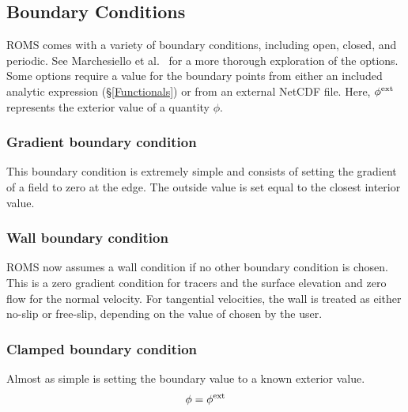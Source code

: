 


\subsection{Boundary Conditions}
ROMS comes with a variety of boundary conditions, including open,
closed, and periodic. See Marchesiello et al.\
\cite{Marchesiello2001} for a more thorough exploration of the
options. Some options require a value for the boundary points
from either an included analytic expression (\S\ref{Functionals})
or from an external NetCDF file. Here, $\phi^{\rm ext}$ represents
the exterior value of a quantity $\phi$.

\subsubsection{Gradient boundary condition}
This boundary condition is extremely simple and consists of setting the
gradient of a field to zero at the edge. The outside value is set equal
to the closest interior value.

\subsubsection{Wall boundary condition}
ROMS now assumes a wall condition if no other boundary condition is
chosen. This is a zero gradient condition for tracers and the
surface elevation and zero flow for the normal velocity. For
tangential velocities, the wall is treated as either no-slip or
free-slip, depending on the value of  chosen by the
user.

\subsubsection{Clamped boundary condition}
Almost as simple is setting the boundary value to a known exterior
value.
\begin{equation}
   \phi = \phi^{\rm ext}
\end{equation}

